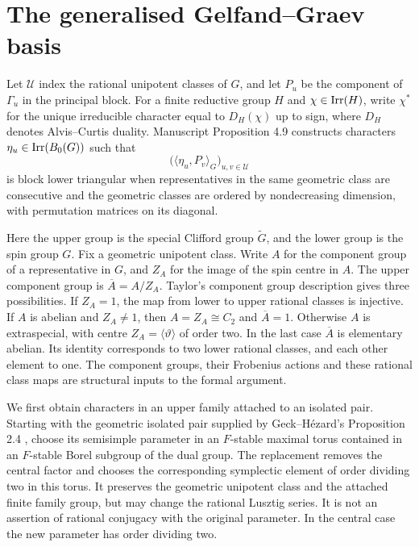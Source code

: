 \section{The generalised Gelfand--Graev basis}

Let $\mathcal U$ index the rational unipotent classes of $G$, and let
$P_u$ be the component of $\Gamma_u$ in the principal block. For a finite
reductive group $H$ and $\chi\in\operatorname{Irr}(H)$, write $\chi^*$ for the unique
irreducible character equal to $D_H(\chi)$ up to sign, where $D_H$ denotes
Alvis--Curtis duality. Manuscript Proposition 4.9
constructs characters $\eta_u\in\operatorname{Irr}(B_0(G))$ such that
\[
 \bigl(\langle\eta_u,P_v\rangle_G\bigr)_{u,v\in\mathcal U}
\]
is block lower triangular when representatives in the same geometric class are consecutive and the geometric classes are ordered by nondecreasing dimension, with permutation matrices on its diagonal.

Here the upper group is the special Clifford group $\widetilde G$, and the lower group is the spin group $G$. Fix a geometric unipotent class. Write $A$ for the component group
of a representative in $G$, and $Z_A$ for the image of the spin centre
in $A$. The upper component group is $\overline A=A/Z_A$.
Taylor's component group description \cite[Section~2]{Taylor2013}
gives three possibilities. If $Z_A=1$, the map from lower to upper
rational classes is injective. If $A$ is abelian and $Z_A\ne1$, then
$A=Z_A\cong C_2$ and $\overline A=1$. Otherwise $A$ is extraspecial,
with centre $Z_A=\langle\vartheta\rangle$ of order two. In the last
case $\overline A$ is elementary abelian. Its identity corresponds
to two lower rational classes, and each other element to one.
The component groups, their Frobenius actions and these rational class
maps are structural inputs to the formal argument.

We first obtain characters in an upper family attached to an isolated
pair. Starting with the geometric isolated pair supplied by Geck--H\'ezard's
Proposition 2.4 \cite{GeckHezard2008}, choose its semisimple parameter
in an $F$-stable maximal torus contained in an $F$-stable Borel subgroup
of the dual group. The replacement removes the central factor and
chooses the corresponding symplectic element of order dividing two
in this torus. It
preserves the geometric unipotent class and the attached finite family
group, but may change the rational Lusztig series. It is not an
assertion of rational conjugacy with the original parameter.
In the central case the new parameter has order dividing two.

